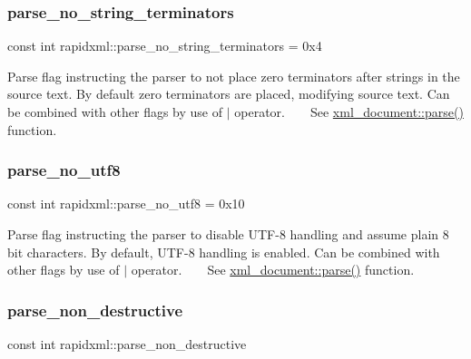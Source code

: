 \subsubsection{\texorpdfstring{parse\_no\_string\_terminators}{parse\_no\_string\_terminators}}
{\footnotesize\ttfamily const int rapidxml\+::parse\+\_\+no\+\_\+string\+\_\+terminators = 0x4}

Parse flag instructing the parser to not place zero terminators after strings in the source text. By default zero terminators are placed, modifying source text. Can be combined with other flags by use of $\vert$ operator. ~\newline
~\newline
 See \mbox{\hyperlink{classrapidxml_1_1xml__document_ac6e73ff9ac323bf5a370c38feb03a6b1}{xml\+\_\+document\+::parse()}} function. \mbox{\label{namespacerapidxml_a22d4aefaceb00d7afabfef7107b108da}} 
\subsubsection{\texorpdfstring{parse\_no\_utf8}{parse\_no\_utf8}}
{\footnotesize\ttfamily const int rapidxml\+::parse\+\_\+no\+\_\+utf8 = 0x10}

Parse flag instructing the parser to disable U\+T\+F-\/8 handling and assume plain 8 bit characters. By default, U\+T\+F-\/8 handling is enabled. Can be combined with other flags by use of $\vert$ operator. ~\newline
~\newline
 See \mbox{\hyperlink{classrapidxml_1_1xml__document_ac6e73ff9ac323bf5a370c38feb03a6b1}{xml\+\_\+document\+::parse()}} function. \mbox{\label{namespacerapidxml_a45d4d8fef551beaaba23a83b847fd6a3}} 
\subsubsection{\texorpdfstring{parse\_non\_destructive}{parse\_non\_destructive}}
{\footnotesize\ttfamily const int rapidxml\+::parse\+\_\+non\+\_\+destructive}

